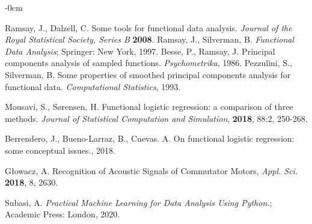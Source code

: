 \documentclass[energies,article,submit,pdftex,moreauthors]{Definitions/mdpi}
\begin{document}
\begin{adjustwidth}{-\extralength}{0cm}



%

\begin{thebibliography}{999}
Ramsay, J., Dalzell, C. Some tools for functional data analysis. {\em Journal of the Royal Statistical Society, Series B} {\bf 2008}.
Ramsay, J., Silverman, B. {\em Functional Data Analysis}; Springer: New York, 1997.
Besse, P., Ramsay, J. Principal components analysis of sampled functions. {\em Psychometrika}, 1986.
Pezzulini, S., Silverman, B. Some properties of smoothed principal components analysis for functional data. {\em Computational Statistics}, 1993.

Mousavi, S., Sørensen, H. Functional logistic regression: a comparison of three methods. {\em Journal of Statistical Computation and Simulation}, {\bf 2018}, 88:2, 250-268.

Berrendero, J., Bueno-Larraz, B., Cuevas. A. On functional logistic regression: some conceptual issues., 2018.

Głowacz, A. Recognition of Acoustic Signals of Commutator Motors, {\em Appl. Sci.} {\bf 2018}, 8, 2630.

Subasi, A. {\em Practical Machine Learning for Data Analysis Using Python.}; Academic Press: London, 2020.



\end{thebibliography}
\end{adjustwidth}
\end{document}
